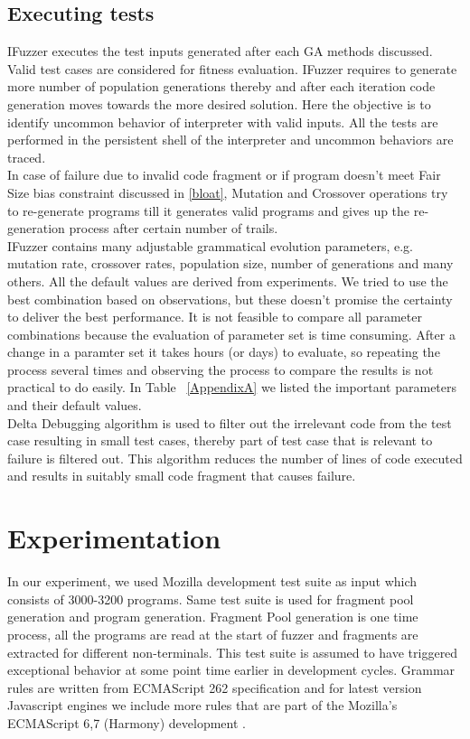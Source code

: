 \documentclass{acm_proc_article-sp}
\begin{document}
\subsection{Executing tests}
IFuzzer executes the test inputs generated after each GA methods discussed. Valid test cases are considered for fitness evaluation. IFuzzer requires to generate more number of population generations thereby and after each iteration code generation moves towards the more desired solution. Here the objective is to identify uncommon behavior of interpreter with valid inputs. All the tests are performed in the persistent shell of the interpreter and uncommon behaviors are traced. \\
\indent In case of failure due to invalid code fragment or if program doesn't meet Fair Size bias constraint discussed in \autoref{bloat}, Mutation and Crossover operations try to re-generate programs till it generates valid programs and gives up the re-generation process after certain number of trails. \\
\indent IFuzzer contains many adjustable grammatical evolution parameters, e.g. mutation rate, crossover rates, population size, number of generations and many others. All the default values are derived from experiments. We tried to use the best combination based on observations, but these doesn't promise the certainty to deliver the best performance. It is not feasible to compare all parameter combinations because the evaluation of parameter set is time consuming. After a change in a paramter set it takes hours (or days) to evaluate, so repeating the process several times and observing the process to compare the results is not practical to do easily. In Table ~\autoref{AppendixA} we listed the important parameters and their default values.\\
\indent  Delta Debugging algorithm \cite{DeltaTool} is used to filter out the irrelevant code from the test case resulting in small test cases, thereby part of test case that is relevant to failure \cite{ZellerH02} is filtered out. This algorithm reduces the number of lines of code executed and  results in suitably small code fragment that causes failure.

\section{Experimentation} \label{eval}
In our experiment, we used Mozilla development test suite as input which consists of 3000-3200 programs. Same test suite is used for fragment pool generation and program generation. Fragment Pool generation is one time process, all the programs are read at the start of fuzzer and fragments are extracted for different non-terminals. This test suite is assumed to have triggered exceptional behavior at some point time earlier in development cycles. Grammar rules are written from ECMAScript 262 specification \cite{EcmaScript} and for latest version Javascript engines we include more rules that are part of the Mozilla's ECMAScript 6,7 (Harmony) development \cite{EcmaScript2}.
\end{document}
